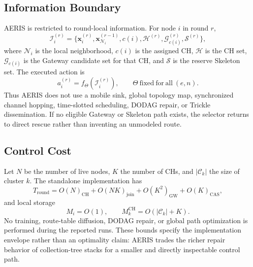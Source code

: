 \documentclass[conference]{IEEEtran}
\begin{document}
\subsection{Information Boundary}
AERIS is restricted to round-local information. For node $i$ in round $r$,
\begin{equation}
\mathcal{I}_i^{(r)}=\{\mathbf{x}_i^{(r)},\mathbf{x}_{\mathcal{N}_i}^{(r-1)},c(i),\mathcal{H}^{(r)},\mathcal{G}_{c(i)}^{(r)},\mathcal{S}^{(r)}\},
\end{equation}
where $\mathcal{N}_i$ is the local neighborhood, $c(i)$ is the assigned CH, $\mathcal{H}$ is the CH set, $\mathcal{G}_{c(i)}$ is the Gateway candidate set for that CH, and $\mathcal{S}$ is the reserve Skeleton set. The executed action is
\begin{equation}
a_i^{(r)}=f_{\Theta}(\mathcal{I}_i^{(r)}),\qquad \Theta\ \mathrm{fixed\ for\ all}\ (e,n).
\end{equation}
Thus AERIS does not use a mobile sink, global topology map, synchronized channel hopping, time-slotted scheduling, DODAG repair, or Trickle dissemination. If no eligible Gateway or Skeleton path exists, the selector returns to direct rescue rather than inventing an unmodeled route.

\subsection{Control Cost}
Let $N$ be the number of live nodes, $K$ the number of CHs, and $|\mathcal{C}_k|$ the size of cluster $k$. The standalone implementation has
\begin{equation}
T_{\mathrm{round}}=O(N)_{\mathrm{CH}}+O(NK)_{\mathrm{join}}+O(K^2)_{\mathrm{GW}}+O(K)_{\mathrm{CAS}},
\end{equation}
and local storage
\begin{equation}
M_i=O(1),\qquad M_k^{\mathrm{CH}}=O(|\mathcal{C}_k|+K).
\end{equation}
No training, route-table diffusion, DODAG repair, or global path optimization is performed during the reported runs. These bounds specify the implementation envelope rather than an optimality claim: AERIS trades the richer repair behavior of collection-tree stacks for a smaller and directly inspectable control path.
\end{document}
